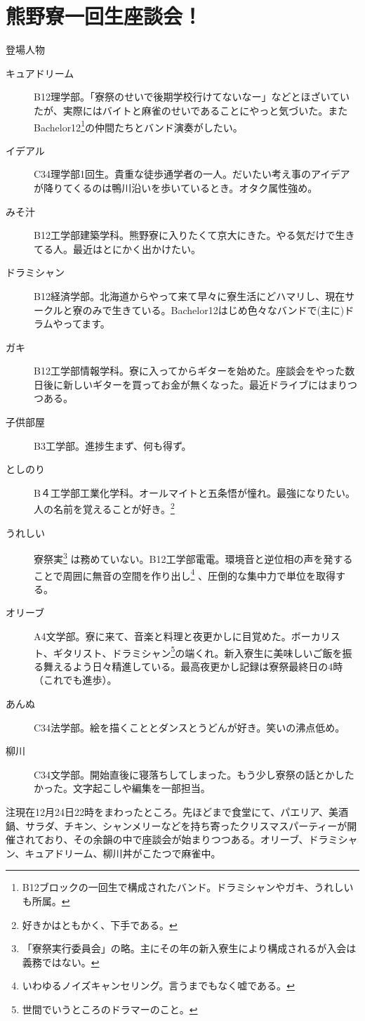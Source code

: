 \section{熊野寮一回生座談会！}
\vspace{3mm}




\begin{itembox}[l]{\LARGE 登場人物}
\begin{description}
\item[キュアドリーム]
B12理学部。「寮祭のせいで後期学校行けてないなー」などとほざいていたが、実際にはバイトと麻雀のせいであることにやっと気づいた。またBachelor12\footnote{ B12ブロックの一回生で構成されたバンド。ドラミシャンやガキ、うれしいも所属。}の仲間たちとバンド演奏がしたい。
\item[イデアル]
C34理学部1回生。貴重な徒歩通学者の一人。だいたい考え事のアイデアが降りてくるのは鴨川沿いを歩いているとき。オタク属性強め。
\item[みそ汁]
B12工学部建築学科。熊野寮に入りたくて京大にきた。やる気だけで生きてる人。最近はとにかく出かけたい。
\item[ドラミシャン]
B12経済学部。北海道からやって来て早々に寮生活にどハマリし、現在サークルと寮のみで生きている。Bachelor12はじめ色々なバンドで(主に)ドラムやってます。
\item[ガキ]
B12工学部情報学科。寮に入ってからギターを始めた。座談会をやった数日後に新しいギターを買ってお金が無くなった。最近ドライブにはまりつつある。
\item[子供部屋]
B3工学部。進捗生まず、何も得ず。
\item[としのり]
B４工学部工業化学科。オールマイトと五条悟が憧れ。最強になりたい。人の名前を覚えることが好き。\footnote{好きかはともかく、下手である。}
\item[うれしい]
寮祭実\footnote{「寮祭実行委員会」の略。主にその年の新入寮生により構成されるが入会は義務ではない。} は務めていない。B12工学部電電。環境音と逆位相の声を発することで周囲に無音の空間を作り出し\footnote{ いわゆるノイズキャンセリング。言うまでもなく嘘である。} 、圧倒的な集中力で単位を取得する。
\item[オリーブ]
A4文学部。寮に来て、音楽と料理と夜更かしに目覚めた。ボーカリスト、ギタリスト、ドラミシャン\footnote{世間でいうところのドラマーのこと。}の端くれ。新入寮生に美味しいご飯を振る舞えるよう日々精進している。最高夜更かし記録は寮祭最終日の4時（これでも進歩）。
\item[あんぬ]
C34法学部。絵を描くこととダンスとうどんが好き。笑いの沸点低め。
\item[柳川]
C34文学部。開始直後に寝落ちしてしまった。もう少し寮祭の話とかしたかった。文字起こしや編集を一部担当。
\end{description}
\end{itembox}
注現在12月24日22時をまわったところ。先ほどまで食堂にて、パエリア、美酒鍋、サラダ、チキン、シャンメリーなどを持ち寄ったクリスマスパーティーが開催されており、その余韻の中で座談会が始まりつつある。オリーブ、ドラミシャン、キュアドリーム、柳川丼がこたつで麻雀中。




